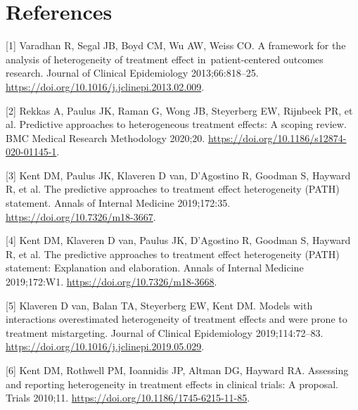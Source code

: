 \documentclass{article}
\newenvironment{cslreferences}%
  {}%
  {\par}
\begin{document}
\newpage

\hypertarget{references}{%
\section{References}\label{references}}

\nolinenumbers
\setlength{\parindent}{-0.25in}
\setlength{\leftskip}{0.25in}

\noindent

\hypertarget{refs}{}
\begin{cslreferences}
\leavevmode\hypertarget{ref-Varadhan2013}{}%
{[}1{]} Varadhan R, Segal JB, Boyd CM, Wu AW, Weiss CO. A framework for
the analysis of heterogeneity of treatment effect in~patient-centered
outcomes research. Journal of Clinical Epidemiology 2013;66:818--25.
\url{https://doi.org/10.1016/j.jclinepi.2013.02.009}.

\leavevmode\hypertarget{ref-Rekkas2020}{}%
{[}2{]} Rekkas A, Paulus JK, Raman G, Wong JB, Steyerberg EW, Rijnbeek
PR, et al. Predictive approaches to heterogeneous treatment effects: A
scoping review. BMC Medical Research Methodology 2020;20.
\url{https://doi.org/10.1186/s12874-020-01145-1}.

\leavevmode\hypertarget{ref-Kent2019}{}%
{[}3{]} Kent DM, Paulus JK, Klaveren D van, D'Agostino R, Goodman S,
Hayward R, et al. The predictive approaches to treatment effect
heterogeneity (PATH) statement. Annals of Internal Medicine 2019;172:35.
\url{https://doi.org/10.7326/m18-3667}.

\leavevmode\hypertarget{ref-PathEnE}{}%
{[}4{]} Kent DM, Klaveren D van, Paulus JK, D'Agostino R, Goodman S,
Hayward R, et al. The predictive approaches to treatment effect
heterogeneity (PATH) statement: Explanation and elaboration. Annals of
Internal Medicine 2019;172:W1. \url{https://doi.org/10.7326/m18-3668}.

\leavevmode\hypertarget{ref-vanKlaveren2019}{}%
{[}5{]} Klaveren D van, Balan TA, Steyerberg EW, Kent DM. Models with
interactions overestimated heterogeneity of treatment effects and were
prone to treatment mistargeting. Journal of Clinical Epidemiology
2019;114:72--83. \url{https://doi.org/10.1016/j.jclinepi.2019.05.029}.

\leavevmode\hypertarget{ref-Kent2010}{}%
{[}6{]} Kent DM, Rothwell PM, Ioannidis JP, Altman DG, Hayward RA.
Assessing and reporting heterogeneity in treatment effects in clinical
trials: A proposal. Trials 2010;11.
\url{https://doi.org/10.1186/1745-6215-11-85}.


\end{cslreferences}
\end{document}
